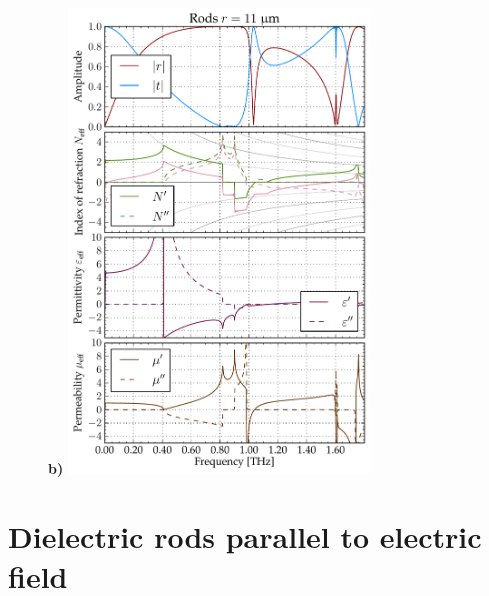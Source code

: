 {\begin{figure}[ht]
\textbf{b)}	\includegraphics[width=8.0cm]{img/old/ERods_eps100_11um_FDTD.pdf}
\end{figure}

}

\section{Dielectric rods parallel to electric field} %

\label{sect_diel_rods_el}
\cite{yang2015}






